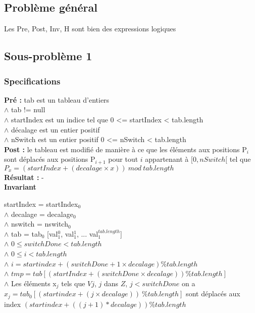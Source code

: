 \subsection{Problème général}
Les Pre, Post, Inv, H sont bien des expressions logiques 
\subsection{Sous-problème 1}

\subsubsection*{Specifications}
\textbf{Pré : } tab est un tableau d'entiers\\
 	  \indent \indent $\wedge$ tab != null\\
	  \indent \indent $\wedge$ startIndex est un indice tel que 0 <= startIndex < tab.length \\
	  \indent \indent $\wedge$ décalage est un entier positif \\
	  \indent \indent $\wedge$ nSwitch est un entier positif 0 <= nSwitch < tab.length\\
\textbf{Post :}  le tableau est modifié de manière à ce que les éléments aux positions P$_{i}$ sont déplacés aux positions P$_{i+1}$ pour tout $i$ appartenant à $[0,nSwitch[$ tel que $P_{x} = (startIndex + (decalage\times x))\ mod\ tab.length$\\
\textbf{Résultat :}  - \\


\textbf{Invariant}

	startIndex = startIndex$_{0}$\\
$\wedge$ decalage = decalage$_{0}$\\
$\wedge$ nswitch = nswitch$_{0}$\\
$\wedge$ tab = tab$_{0}$ [val$_{1}^{0}$, val$_{1}^{1}$, ... val$_{1}^{tab.length}$]\\
$\wedge$ $0\leq switchDone < tab.length$\\
$\wedge$ $0\leq i < tab.length$\\
$\wedge$ $i = startindex + (switchDone+1\times decalage) \% tab.length$\\
$\wedge$ $tmp = tab[(startIndex + (switchDone\times decalage))  \% tab.length]$\\
$\wedge$ Les éléments x$_{j}$ tels que $Vj$, $j$ dans $Z$, $j<switchDone$ on a $x_{j}=tab_{0}[(startindex + (j\times decalage))\ \% tab.length]$ sont déplacés aux index $(startindex + ((j+1)* decalage))\%tab.length$\\

